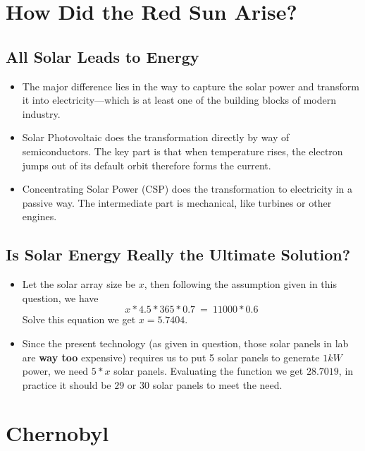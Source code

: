 \documentclass[12pt]{article}
\begin{document}
\section{How Did the Red Sun Arise?}
\label{sec:how-did-red}

\subsection{All Solar Leads to Energy}
\label{sec:all-solar-leads}

\begin{itemize}
\item The major difference lies in the way to capture the solar power
  and transform it into electricity---which is at least one of the
  building blocks of modern industry.
\item Solar Photovoltaic does the transformation directly by way of
  semiconductors. The key part is that when temperature rises, the
  electron jumps out of its default orbit therefore forms the current.
\item Concentrating Solar Power (CSP) does the transformation to
  electricity in a passive way. The intermediate part is mechanical,
  like turbines or other engines. 
\end{itemize}

\subsection{Is Solar Energy Really the Ultimate Solution?}
\label{sec:solar-energy-really}

\begin{itemize}
\item Let the solar array size be $x$, then following the assumption
  given in this question, we have
  \begin{equation}
    \label{eq:11}
    x*4.5*365*0.7~=~11000*0.6
  \end{equation}
  Solve this equation we get $x=5.7404$.
\item Since the present technology (as given in question, those solar
  panels in lab are \textbf{way too} expensive) requires us to put 5
  solar panels to generate $1kW$ power, we need $5*x$ solar
  panels. Evaluating the function we get $28.7019$, in practice it
  should be $29$ or $30$ solar panels to meet the need.
\end{itemize}


\section{Chernobyl}
\label{sec:chernobyl}
\end{document}
